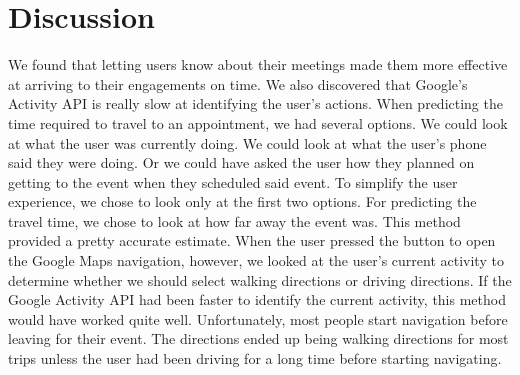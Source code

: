 \section{Discussion}
We found that letting users know about their meetings made them more effective at arriving to their engagements on time. We also discovered that Google's Activity API is really slow at identifying the user's actions. When predicting the time required to travel to an appointment, we had several options. We could look at what the user was currently doing. We could look at what the user's phone said they were doing. Or we could have asked the user how they planned on getting to the event when they scheduled said event. To simplify the user experience, we chose to look only at the first two options. For predicting the travel time, we chose to look at how far away the event was. This method provided a pretty accurate estimate. When the user pressed the button to open the Google Maps navigation, however, we looked at the user's current activity to determine whether we should select walking directions or driving directions. If the Google Activity API had been faster to identify the current activity, this method would have worked quite well. Unfortunately, most people start navigation before leaving for their event. The directions ended up being walking directions for most trips unless the user had been driving for a long time before starting navigating.
